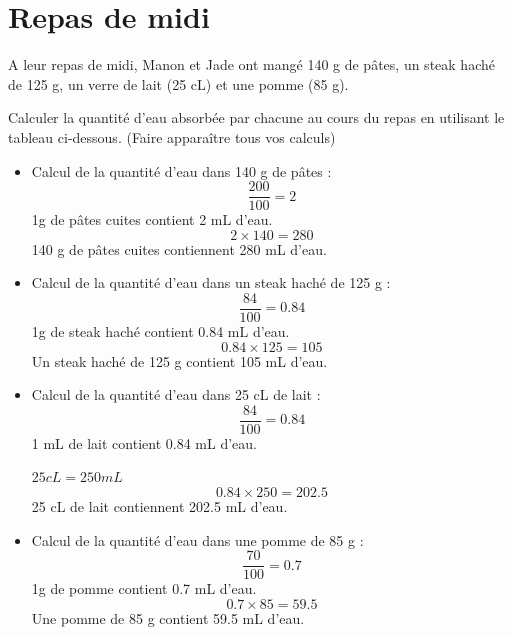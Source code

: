 \documentclass[a4paper,11pt]{exam}
\begin{document}
\section{Repas de midi}

A leur repas de midi, Manon et Jade ont mangé 140 g de pâtes, un steak haché de 125 g, un verre de lait (25 cL) et une pomme (85 g).


\begin{questions}
	\question Calculer la quantité d'eau absorbée par chacune au cours du repas en utilisant le tableau ci-dessous. (Faire apparaître tous vos calculs)
	\begin{solution}
		\begin{itemize}
			\item Calcul de la quantité d'eau dans 140 g de pâtes :
			\begin{equation*}
				\frac{200}{100}= \num{2}
			\end{equation*}
			1g de pâtes cuites contient \num{2} mL d'eau.
			\begin{equation*}
			\num{2} \times 140 = 280
			\end{equation*}
			140 g de pâtes cuites contiennent 280 mL d'eau.
			
			
			\item Calcul de la quantité d'eau dans un steak haché  de 125 g :
			\begin{equation*}
			\frac{84}{100}= \num{0.84}
			\end{equation*}
			1g de steak haché contient \num{0.84} mL d'eau.
			\begin{equation*}
			\num{0.84} \times 125 = 105
			\end{equation*}
			Un steak haché de 125 g contient 105 mL d'eau.
			
			\item Calcul de la quantité d'eau dans 25 cL de lait :
			\begin{equation*}
			\frac{84}{100}= \num{0.84}
			\end{equation*}
			1 mL de lait contient \num{0.84} mL d'eau.
			
			$25 cL = 250 mL$
			\begin{equation*}
			\num{0.84} \times 250 = \num{202.5}
			\end{equation*}
			25 cL de lait contiennent \num{202.5} mL d'eau.
			
			\item Calcul de la quantité d'eau dans une pomme de 85 g :
			\begin{equation*}
			\frac{70}{100}= \num{0.7}
			\end{equation*}
			1g de pomme contient \num{0.7} mL d'eau.
			\begin{equation*}
			\num{0.7} \times 85 = \num{59.5}
			\end{equation*}
			Une pomme de 85 g contient \num{59.5} mL d'eau.
			

\end{itemize}
\end{solution}
\end{questions}
\end{document}
